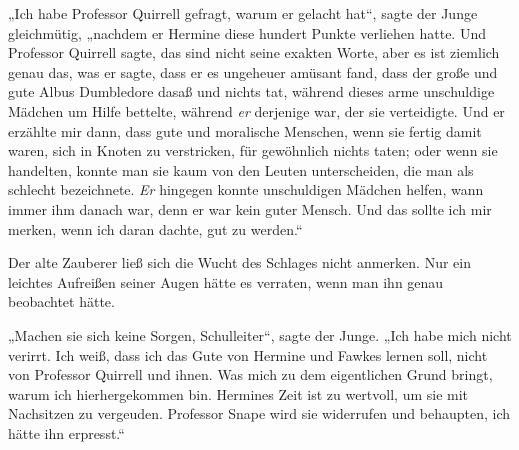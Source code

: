 „Ich habe Professor Quirrell gefragt, warum er gelacht hat“, sagte der Junge gleichmütig, „nachdem er Hermine diese hundert Punkte verliehen hatte. Und Professor Quirrell sagte, das sind nicht seine exakten Worte, aber es ist ziemlich genau das, was er sagte, dass er es ungeheuer amüsant fand, dass der große und gute Albus Dumbledore dasaß und nichts tat, während dieses arme unschuldige Mädchen um Hilfe bettelte, während \emph{er} derjenige war, der sie verteidigte. Und er erzählte mir dann, dass gute und moralische Menschen, wenn sie fertig damit waren, sich in Knoten zu verstricken, für gewöhnlich nichts taten; oder wenn sie handelten, konnte man sie kaum von den Leuten unterscheiden, die man als schlecht bezeichnete. \emph{Er} hingegen konnte unschuldigen Mädchen helfen, wann immer ihm danach war, denn er war kein guter Mensch. Und das sollte ich mir merken, wenn ich daran dachte, gut zu werden.“

Der alte Zauberer ließ sich die Wucht des Schlages nicht anmerken. Nur ein leichtes Aufreißen seiner Augen hätte es verraten, wenn man ihn genau beobachtet hätte.

„Machen sie sich keine Sorgen, Schulleiter“, sagte der Junge.
„Ich habe mich nicht verirrt. Ich weiß, dass ich das Gute von Hermine und Fawkes lernen soll, nicht von Professor Quirrell und ihnen. Was mich zu dem eigentlichen Grund bringt, warum ich hierhergekommen bin. Hermines Zeit ist zu wertvoll, um sie mit Nachsitzen zu vergeuden. Professor Snape wird sie widerrufen und behaupten, ich hätte ihn erpresst.“

